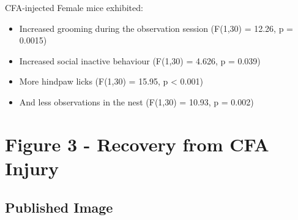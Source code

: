 \documentclass[
]{book}
\newenvironment{Shaded}{\begin{snugshade}}{\end{snugshade}}
\newcommand{\AttributeTok}[1]{\textcolor[rgb]{0.13,0.29,0.53}{#1}}
\newcommand{\ConstantTok}[1]{\textcolor[rgb]{0.56,0.35,0.01}{#1}}
\newcommand{\DecValTok}[1]{\textcolor[rgb]{0.00,0.00,0.81}{#1}}
\newcommand{\FunctionTok}[1]{\textcolor[rgb]{0.13,0.29,0.53}{\textbf{#1}}}
\newcommand{\NormalTok}[1]{#1}
\newcommand{\SpecialCharTok}[1]{\textcolor[rgb]{0.81,0.36,0.00}{\textbf{#1}}}
\newcommand{\StringTok}[1]{\textcolor[rgb]{0.31,0.60,0.02}{#1}}
\providecommand{\tightlist}{%
  \setlength{\itemsep}{0pt}\setlength{\parskip}{0pt}}
\begin{document}
CFA-injected Female mice exhibited:

\begin{itemize}
\tightlist
\item
  Increased grooming during the observation session (F(1,30) = 12.26, p = 0.0015)
\item
  Increased social inactive behaviour (F(1,30) = 4.626, p = 0.039)
\item
  More hindpaw licks (F(1,30) = 15.95, p \textless{} 0.001)
\item
  And less observations in the nest (F(1,30) = 10.93, p = 0.002)
\end{itemize}

\begin{Shaded}
\end{Shaded}

\hypertarget{figure-3---recovery-from-cfa-injury}{%
\chapter*{Figure 3 - Recovery from CFA Injury}\label{figure-3---recovery-from-cfa-injury}}

\hypertarget{published-image-2}{%
\section*{Published Image}\label{published-image-2}}
\end{document}
